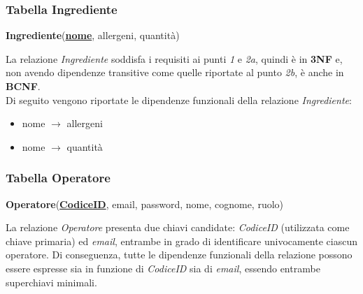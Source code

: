 \documentclass[12pt,a4paper]{article}
\begin{document}
    \subsubsection*{Tabella Ingrediente}
    \begin{tcolorbox}[
        colback=gray!8,
        colframe=black!30,
        title=
    ]
        \textbf{Ingrediente}(\textbf{\uline{nome}}, allergeni, quantità)
    \end{tcolorbox}
    
    \noindent
    La relazione \textit{Ingrediente} soddisfa i requisiti ai punti \textit{1} e \textit{2a}, quindi è in \textbf{3NF} e, non avendo dipendenze transitive come quelle riportate al punto \textit{2b}, è anche in \textbf{BCNF}.\\
    Di seguito vengono riportate le dipendenze funzionali della relazione \textit{Ingrediente}:
    \begin{itemize}[leftmargin=1em, label=$\circ$]
        \item nome $\rightarrow$ allergeni
        \item nome $\rightarrow$ quantità
    \end{itemize}


    \subsubsection*{Tabella Operatore}
    \begin{tcolorbox}[
        colback=gray!8,
        colframe=black!30,
        title=
    ]
        \textbf{Operatore}(\textbf{\uline{CodiceID}}, email, password, nome, cognome, ruolo)
    \end{tcolorbox}

    \noindent
    La relazione \textit{Operatore} presenta due chiavi candidate: \textit{CodiceID} (utilizzata come chiave primaria) ed \textit{email}, entrambe in grado di identificare univocamente ciascun operatore. Di conseguenza, tutte le dipendenze funzionali della relazione possono essere espresse sia in funzione di \textit{CodiceID} sia di \textit{email}, essendo entrambe superchiavi minimali.
\end{document}
